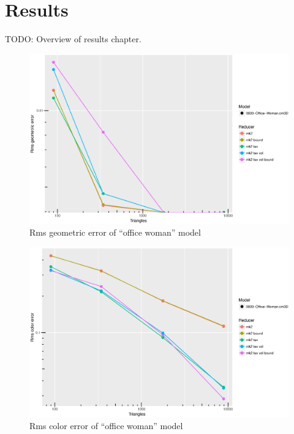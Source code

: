 \chapter{Results} \label{cha:results}
TODO: Overview of results chapter.


\begin{figure}[h]
    \centering
    \includegraphics[width=\textwidth]{figures/Rdata/geometric_800.eps}
    \caption{Rms geometric error of ``office woman'' model}
    \label{fig:woman_geometric_error}
\end{figure}


\begin{figure}[h]
    \centering
    \includegraphics[width=\textwidth]{figures/Rdata/color_800.eps}
    \caption{Rms color error of ``office woman'' model}
    \label{fig:woman_color_error}
\end{figure}

